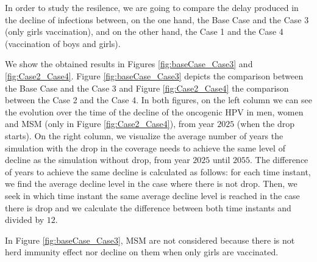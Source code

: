 In order to study the resilence, we are going to compare the delay produced in the decline of infections between, on the one hand, the Base Case and the Case 3 (only girls vaccination), and on the other hand, the Case 1 and the Case 4 (vaccination of boys and girls). 

We show the obtained results in Figures \ref{fig:baseCase_Case3} and \ref{fig:Case2_Case4}. Figure \ref{fig:baseCase_Case3} depicts the comparison between the Base Case and the Case 3 and Figure \ref{fig:Case2_Case4} the comparison between the Case 2 and the Case 4. In both figures, on the left column we can see the evolution over the time of the decline of the oncogenic HPV in men, women and MSM (only in Figure \ref{fig:Case2_Case4}), from year $2025$ (when the drop starts). On the right column, we visualize the average number of years the simulation with the drop in the coverage needs to achieve the same level of decline as the simulation without drop, from year $2025$ until $2055$. The difference of years to achieve the same decline is calculated as follows: for each time instant, we find the average decline level in the case where there is not drop. Then, we seek in which time instant the same average decline level is reached in the case there is drop and we calculate the difference between both time instants and divided by $12$.

In Figure \ref{fig:baseCase_Case3}, MSM are not considered because there is not herd immunity effect nor decline on them when only girls are vaccinated.  

